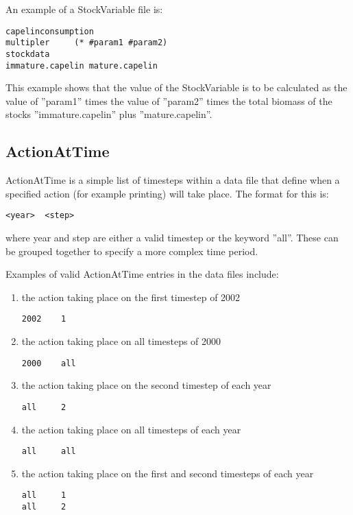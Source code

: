 \documentclass[10pt,twoside]{book}
\begin{document}
\bigskip
An example of a StockVariable file is:

{\small\begin{verbatim}
capelinconsumption
multipler     (* #param1 #param2)
stockdata
immature.capelin mature.capelin
\end{verbatim}}

This example shows that the value of the StockVariable is to be calculated as the value of ''param1'' times the value of ''param2'' times the total biomass of the stocks ''immature.capelin'' plus ''mature.capelin''.

\subsection{ActionAtTime}\label{subsec:aat}
ActionAtTime is a simple list of timesteps within a data file that define when a specified action (for example printing) will take place.  The format for this is:

{\small\begin{verbatim}
<year>  <step>
\end{verbatim}}

where year and step are either a valid timestep or the keyword ''all''.  These can be grouped together to specify a more complex time period.

\bigskip
Examples of valid ActionAtTime entries in the data files include:

\begin{enumerate}
\item the action taking place on the first timestep of 2002
{\small\begin{verbatim}
2002    1
\end{verbatim}}
\item the action taking place on all timesteps of 2000
{\small\begin{verbatim}
2000    all
\end{verbatim}}
\item the action taking place on the second timestep of each year
{\small\begin{verbatim}
all     2
\end{verbatim}}
\item the action taking place on all timesteps of each year
{\small\begin{verbatim}
all     all
\end{verbatim}}
\item the action taking place on the first and second timesteps of each year
{\small\begin{verbatim}
all     1
all     2
\end{verbatim}}
\end{enumerate}
\end{document}
